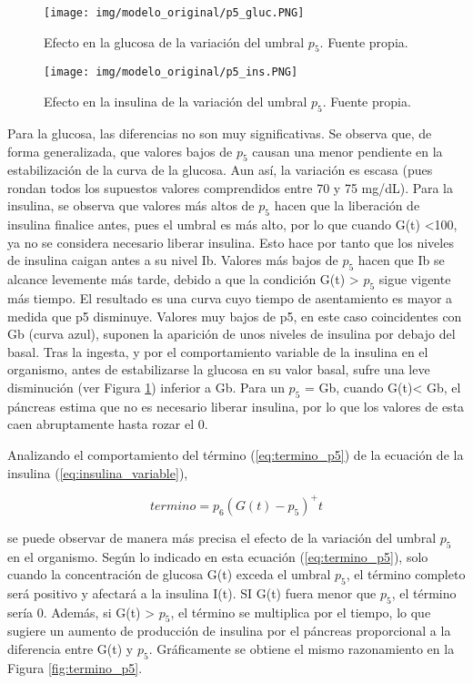 \begin{figure}[htbp]
    \centering
    \texttt{[image: img/modelo\_original/p5\_gluc.PNG]}
    \caption{Efecto en la glucosa de la variación del umbral $p_5$. Fuente propia.}
    \label{fig:p5_gluc}
\end{figure}
\begin{figure}[htbp]
    \centering
    \texttt{[image: img/modelo\_original/p5\_ins.PNG]}
    \caption{Efecto en la insulina de la variación del umbral $p_5$. Fuente propia.}
    \label{fig:p5_ins}
\end{figure}

Para la glucosa, las diferencias no son muy significativas. Se observa que, de forma generalizada, que valores bajos de $p_5$ causan una menor pendiente en la estabilización de la curva de la glucosa. Aun así, la variación es escasa (pues rondan todos los supuestos valores comprendidos entre 70 y 75 mg/dL).
Para la insulina, se observa que valores más altos de $p_5$ hacen que la liberación de insulina finalice antes, pues el umbral es más alto, por lo que cuando G(t) <100, ya no se considera necesario liberar insulina. Esto hace por tanto que los niveles de insulina caigan antes a su nivel Ib. Valores más bajos de $p_5$ hacen que Ib se alcance levemente más tarde, debido a que la condición G(t) > $p_5$ sigue vigente más tiempo. El resultado es una curva cuyo tiempo de asentamiento es mayor a medida que p5 disminuye.
Valores muy bajos de p5, en este caso coincidentes con Gb (curva azul), suponen la aparición de unos niveles de insulina por debajo del basal. Tras la ingesta, y por el comportamiento variable de la insulina en el organismo, antes de estabilizarse la glucosa en su valor basal, sufre una leve disminución (ver Figura \ref{fig:p5_gluc}) inferior a Gb. Para un $p_5$ = Gb, cuando G(t)< Gb, el páncreas estima que no es necesario liberar insulina, por lo que los valores de esta caen abruptamente hasta rozar el 0.

Analizando el comportamiento del término (\ref{eq:termino_p5}) de la ecuación de la insulina (\ref{eq:insulina_variable}),

\begin{equation}
    termino = p_6 (G(t)-p_5)^+ t 
    \label{eq:termino_p5}
\end{equation}

se puede observar de manera más precisa el efecto de la variación del umbral $p_5$ en el organismo. Según lo indicado en esta ecuación (\ref{eq:termino_p5}), solo cuando la concentración de glucosa G(t) exceda el umbral $p_5$, el término completo será positivo y afectará a la insulina I(t). SI G(t) fuera menor que $p_5$, el término sería 0. Además, si G(t) > $p_5$, el término se multiplica por el tiempo, lo que sugiere un aumento de producción de insulina por el páncreas proporcional a la diferencia entre G(t) y $p_5$. Gráficamente se obtiene el mismo razonamiento en la Figura \ref{fig:termino_p5}.

